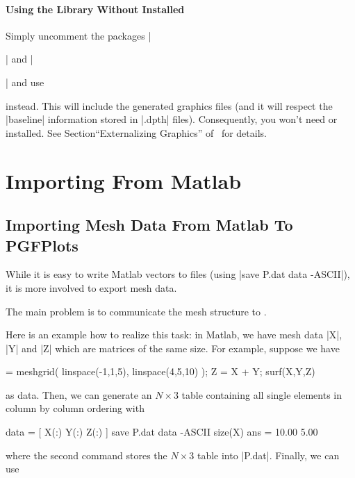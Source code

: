 {\begin{pgfgraphicnamed}


\paragraph{Using the Library Without {\normalfont\pgfname} Installed}

Simply uncomment the packages |\usepackage{tikz}| and |\usepackage{pgfplots}|
and use
%
\begin{codeexample}
\long{}
\end{codeexample}
%
instead. This will include the generated graphics files (and it will respect
the |baseline| information stored in |.dpth| files). Consequently, you won't
need \pgfname{} or \PGFPlots{} installed. See Section``Externalizing Graphics''
of~\cite{tikz} for details.


\section[import-matlab]{Importing From Matlab}

\subsection{Importing Mesh Data From Matlab To PGFPlots}
\label{sec:pgfplots:import:matlab}

While it is easy to write Matlab vectors to files (using
|save P.dat data -ASCII|), it is more involved to export mesh data.

The main problem is to communicate the mesh structure to \PGFPlots{}.

Here is an example how to realize this task: in Matlab, we have mesh data |X|,
|Y| and |Z| which are matrices of the same size. For example, suppose we have
%
\begin{codeexample} = meshgrid( linspace(-1,1,5), linspace(4,5,10) );
Z = X + Y;
surf(X,Y,Z)
\end{codeexample}
%
\noindent as data. Then, we can generate an $N \times 3$ table containing all
single elements in column by column ordering with
%
\begin{codeexample}
data = [ X(:) Y(:) Z(:) ]
save P.dat data -ASCII
size(X)
ans =
   10.00    5.00
\end{codeexample}
%
\noindent where the second command stores the $N \times 3$ table into |P.dat|.
Finally, we can use


\end{pgfgraphicnamed}}
